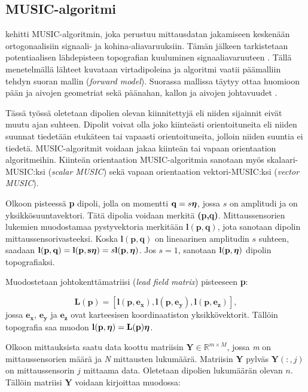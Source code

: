 \subsection{MUSIC-algoritmi}
\cite{Schmidt1986MultipleEstimation} kehitti MUSIC-algoritmin, joka perustuu mittausdatan jakamiseen keskenään ortogonaalisiin signaali- ja kohina-aliavaruuksiin. Tämän jälkeen tarkistetaan potentiaalisen lähdepisteen topografian kuuluminen signaaliavaruuteen \citep{Mosher1999SourceMUSIC}. Tällä menetelmällä lähteet kuvataan virtadipoleina ja algoritmi vaatii päämalliin tehdyn suoran mallin (\textit{forward model}). Suorassa mallissa täytyy ottaa huomioon pään ja aivojen geometriat sekä päänahan, kallon ja aivojen johtavuudet \citep[s. 87]{hansen2010meg}.

Tässä työssä oletetaan dipolien olevan kiinnitettyjä eli niiden sijainnit eivät muutu ajan suhteen. Dipolit voivat olla joko kiinteästi orientoituneita eli niiden suunnat tiedetään etukäteen tai vapaasti orientoituneita, jolloin niiden suuntia ei tiedetä. MUSIC-algoritmit voidaan jakaa kiinteän tai vapaan orientaation algoritmeihin. Kiinteän orientaation MUSIC-algoritmia sanotaan myös skalaari-MUSIC:ksi (\textit{scalar MUSIC}) sekä vapaan orientaation vektori-MUSIC:ksi (\textit{vector MUSIC}). \citep{Makela2018TruncatedLocalization}

Olkoon pisteessä \textbf{p} dipoli, jolla on momentti $\mathbf{q} = s\text{\boldmath$\eta$}$, jossa $s$ on amplitudi ja \text{\boldmath$\eta$} on yksikkösuuntavektori. Tätä dipolia voidaan merkitä \textbf{(p,q)}. Mittaussensorien lukemien muodostamaa pystyvektoria merkitään $\mathbf{l(p,q)}$, jota sanotaan dipolin mittaussensorivasteeksi. Koska $\mathbf{l(p,q)}$ on lineaarinen amplitudin $s$ suhteen, saadaan $\mathbf{l(p,q)} = \mathbf{l(p,s\text{\boldmath$\eta$})} = s\mathbf{l(p,\text{\boldmath$\eta$})}$. Jos $s=1$, sanotaan $\mathbf{l(p,\text{\boldmath$\eta$})}$ dipolin topografiaksi.

Muodostetaan johtokenttämatriisi (\textit{lead field matrix}) pisteeseen \textbf{p}:

\begin{equation}
    \mathbf{L(p) = [l(p,e_x),l(p,e_y),l(p,e_z)]},
\end{equation}
jossa $\mathbf{e_x}$, $\mathbf{e_y}$ ja $\mathbf{e_z}$ ovat karteesisen koordinaatiston yksikkövektorit. Tällöin topografia saa muodon $\mathbf{l(p},\text{\boldmath$\eta$})=\mathbf{L(p})\mathbf{\text{\boldmath$\eta$}}$.

Olkoon mittauksista saatu data koottu matriisin $\mathbf{Y}\in \mathbb{R}^{m\times M}$, jossa \textit{m} on mittaussensorien määrä ja \textit{N} mittausten lukumäärä. Matriisin \textbf{Y} pylväs $\mathbf{Y}(:,j)$ on mittaussensorin $j$ mittaama data. Oletetaan dipolien lukumäärän olevan $n$. Tällöin matriisi $\mathbf{Y}$ voidaan kirjoittaa muodossa:

